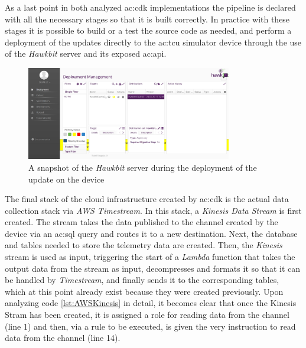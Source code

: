 As a last point in both analyzed \gls{ac:cdk} implementations the pipeline is declared with all the necessary stages so that it is built correctly. In practice with these stages it is possible to build or a test the source code as needed, and perform a deployment of the updates directly to the \gls{ac:tcu} simulator device through the use of the \textit{Hawkbit} server and its exposed \gls{ac:api}.
\begin{figure}[h]  %
    \centering
    \includegraphics[width=0.8\textwidth]{images/hawkbit_server.png}  %
    \caption{A snapshot of the \textit{Hawkbit} server during the deployment of the update on the device}
    \label{fig:HawkbitServer}
\end{figure}
The final stack of the cloud infrastructure created by \gls{ac:cdk} is the actual data collection stack via \textit{AWS Timestream}. In this stack, a \textit{Kinesis Data Stream} is first created. The stream takes the data published to the channel created by the device via an \gls{ac:sql} query and routes it to a new destination. Next, the database and tables needed to store the telemetry data are created. Then, the \textit{Kinesis} stream is used as input, triggering the start of a \textit{Lambda} function that takes the output data from the stream as input, decompresses and formats it so that it can be handled by \textit{Timestream}, and finally sends it to the corresponding tables, which at this point already exist because they were created previously.
Upon analyzing code \ref{lst:AWSKinesis} in detail, it becomes clear that once the Kinesis Stram has been created, it is assigned a role for reading data from the channel (line 1) and then, via a rule to be executed, is given the very instruction to read data from the channel (line 14).
